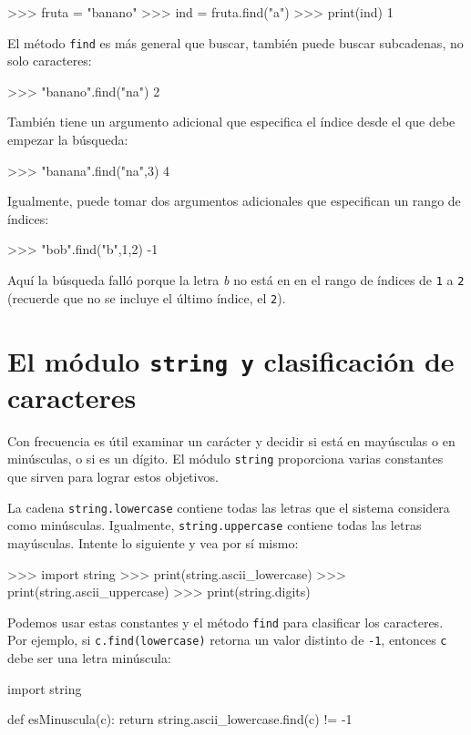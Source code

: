 \begin{pyconcode}
>>> fruta = "banano"
>>> ind = fruta.find("a")
>>> print(ind)
1
\end{pyconcode}

El método \texttt{find} es más general que buscar, también puede buscar
subcadenas, no solo caracteres:
\begin{pyconcode}
>>> "banano".find("na")
2
\end{pyconcode}

También tiene un argumento adicional que especifica el índice desde
el que debe empezar la búsqueda:
\begin{pyconcode}
>>> "banana".find("na",3) 
4
\end{pyconcode}

Igualmente, puede tomar dos argumentos adicionales que especifican
un rango de índices:
\begin{pyconcode}
>>> "bob".find("b",1,2) 
-1
\end{pyconcode}

Aquí la búsqueda falló porque la letra {\em b} no está en en el
rango de índices de \texttt{1} a \texttt{2} (recuerde que no se incluye
el último índice, el \texttt{2}).

\section{El módulo \texttt{string y} clasificación de caracteres}

 

\label{in}  
  

Con frecuencia es útil examinar un carácter y decidir si está en mayúsculas
o en minúsculas, o si es un dígito. El módulo \texttt{string} proporciona
varias constantes que sirven para lograr estos objetivos.

La cadena \texttt{string.lowercase} contiene todas las letras que
el sistema considera como minúsculas. Igualmente, \texttt{string.uppercase}
contiene todas las letras mayúsculas. Intente lo siguiente y vea por
sí mismo:
\begin{pyconcode}
>>> import string
>>> print(string.ascii_lowercase)
>>> print(string.ascii_uppercase)
>>> print(string.digits)
\end{pyconcode}
Podemos usar estas constantes y el método \texttt{find} para clasificar
los caracteres. Por ejemplo, si \texttt{c.find(lowercase)} retorna
un valor distinto de \texttt{-1}, entonces \texttt{c} debe ser una
letra minúscula:
\begin{pythoncode}
import string

def esMinuscula(c):
  return string.ascii_lowercase.find(c) != -1
\end{pythoncode}

